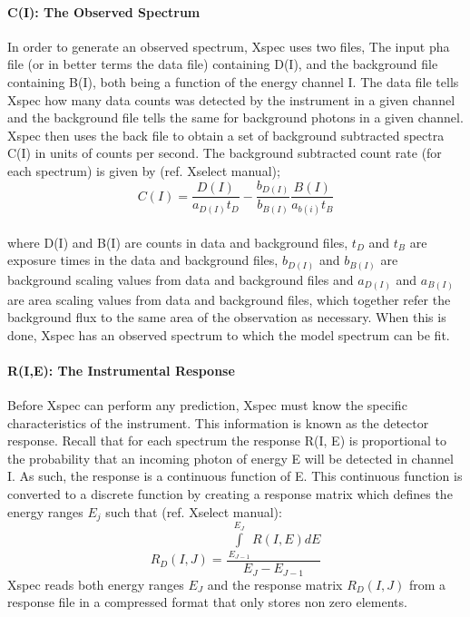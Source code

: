 \documentclass[a4paper,twoside]{report}
\numberwithin{equation}{section}
\begin{document}
\paragraph{C(I): The Observed Spectrum}
In order to generate an observed spectrum, Xspec uses two files, The input pha file (or in better terms the data file) containing D(I), and the background file containing B(I), both being a function of the energy channel I. The data file tells Xspec how many data counts was detected by the instrument in a given channel and the background file tells the same for background photons in a given channel. Xspec then uses the back file to obtain a set of background subtracted spectra C(I) in units of counts per second. The background subtracted count rate (for each spectrum) is given by (ref. Xselect manual);
\begin{equation}
{C(I)} = \frac{D(I)}{a_{D(I)} t_D} - \frac{b_{D(I)}}{b_{B(I)}} \frac{B(I)}{a_{b(i)} t_B}
\end{equation}
\paragraph{}
where D(I) and B(I) are counts in data and background files, ${t_D}$ and ${t_B}$ are exposure times in the data and background files, ${b_{D(I)}}$ and ${b_{B(I)}}$ are background scaling values from data and background files and ${a_{D(I)}}$ and ${a_{B(I)}}$  are area scaling values from data and background files, which together refer the background flux to the same area of the observation as necessary. When this is done, Xspec has an observed spectrum to which the model spectrum can be fit.
\paragraph{R(I,E): The Instrumental Response}
Before Xspec can perform any prediction, Xspec must know the specific characteristics of the instrument. This information is known as the detector response. Recall that for each spectrum the response R(I, E) is proportional to the probability that an incoming photon of energy E will be detected in channel I. As such, the response is a continuous function of E. This continuous function is converted to a discrete function by creating a response matrix which defines the energy ranges $E_j$ such that (ref. Xselect manual):
\begin{equation}
{R_D(I,J)} = \frac{\int\limits_{E_{J-1}}^{E_J} R(I,E) dE}{{E_J}-{E_{J-1}}}
\end{equation}
Xspec reads both energy ranges $E_J$ and the response matrix $R_D (I,J)$ from a response file in a compressed format that only stores non zero elements. 
\end{document}
